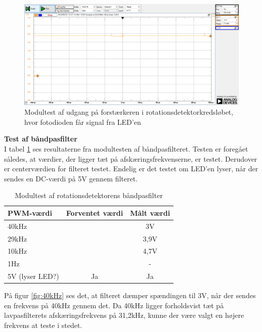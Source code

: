 \begin{figure}[H]
	\centering
	\includegraphics[width=\textwidth]{Test/images/AffyringTest/KanSe/forstaerkerudgang}
	\caption{Modultest af udgang på forstærkeren i rotationsdetektorkredsløbet, hvor fotodioden får signal fra LED'en}
	\label{fig:forstaerkerudgangKanSe}
\end{figure}

\noindent \textbf{Test af båndpasfilter} \\
\noindent I tabel \ref{table:baandpasfiltertest} ses resultaterne fra modultesten af båndpasfilteret. Testen er foregået således, at værdier, der ligger tæt på afskæringsfrekvenserne, er testet. Derudover er centerværdien for filteret testet. Endelig er det testet om LED'en lyser, når der sendes en DC-værdi på 5V gennem filteret. 

\begin{table}[H]
	\centering
	\begin{tabular}{|l|c|c|}
		\hline
		\textbf{PWM-værdi} & \textbf{Forventet værdi} & \textbf{Målt værdi} \\ \hline
		40kHz              & \multicolumn{1}{l|}{}    & 3V                  \\ \hline
		29kHz              & \multicolumn{1}{l|}{}    & 3,9V                \\ \hline
		10kHz              & \multicolumn{1}{l|}{}    & 4,7V                \\ \hline
		1Hz               & \multicolumn{1}{l|}{}    & -                   \\ \hline
		5V (lyser LED?)    & Ja                       & Ja                  \\ \hline
	\end{tabular}
	\caption{Modultest af rotationsdetektorens båndpasfilter}
	\label{table:baandpasfiltertest}
\end{table}

På figur \ref{fig:40kHz} ses det, at filteret dæmper spændingen til 3V, når der sendes en frekvens på 40kHz gennem det. Da 40kHz ligger forholdsvist tæt på lavpasfilterets afskæringsfrekvens på 31,2kHz, kunne der være valgt en højere frekvens at teste i stedet. 

